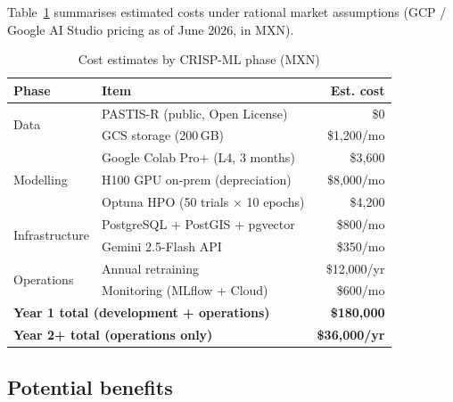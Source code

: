 \documentclass{article}
\begin{document}
Table~\ref{tab:costs} summarises estimated costs under rational market
assumptions (GCP / Google AI Studio pricing as of June 2026, in MXN).

\begin{table}[htbp]
\caption{Cost estimates by CRISP-ML phase (MXN)}
\label{tab:costs}
\centering
\begin{tabularx}{\columnwidth}{lXr}
\toprule
\textbf{Phase} & \textbf{Item} & \textbf{Est. cost} \\
\midrule
\multirow{2}{*}{Data}
  & PASTIS-R (public, Open License) & \$0 \\
  & GCS storage (200\,GB) & \$1,200/mo \\
\midrule
\multirow{3}{*}{Modelling}
  & Google Colab Pro+ (L4, 3 months) & \$3,600 \\
  & H100 GPU on-prem (depreciation) & \$8,000/mo \\
  & Optuna HPO (50 trials $\times$ 10 epochs) & \$4,200 \\
\midrule
\multirow{2}{*}{Infrastructure}
  & PostgreSQL + PostGIS + pgvector & \$800/mo \\
  & Gemini 2.5-Flash API & \$350/mo \\
\midrule
\multirow{2}{*}{Operations}
  & Annual retraining & \$12,000/yr \\
  & Monitoring (MLflow + Cloud) & \$600/mo \\
\midrule
\multicolumn{2}{l}{\textbf{Year 1 total (development + operations)}}
  & \textbf{\$180,000} \\
\multicolumn{2}{l}{\textbf{Year 2+ total (operations only)}}
  & \textbf{\$36,000/yr} \\
\bottomrule
\end{tabularx}
\end{table}

\subsection{Potential benefits}
\end{document}
